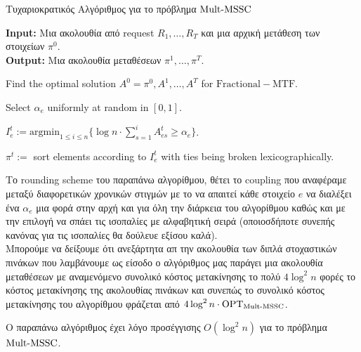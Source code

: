 \begin{algorithm}[ht]
  \caption{Τυχαριοκρατικός Αλγόριθμος για το πρόβλημα $\mathrm{Mult}\text{-}\mathrm{MSSC}$}\label{alg:rand_rounding}
  \textbf{Input:} Μια ακολουθία από request $R_1,\ldots,R_T$ και μια αρχική μετάθεση των στοιχείων $\pi^0$.\\
  \textbf{Output:} Μια ακολουθία μεταθέσεων $\pi^1,\ldots,\pi^T$.

 \begin{algorithmic}[1]
 \STATE Find the optimal solution $A^0=\pi^0,A^1,\ldots,A^T$ for $\mathrm{Fractional-MTF}$. 

        \STATE Select $\alpha_e$ uniformly at random in $[0,1]$.
        \ENDFOR

              
                \STATE $I_e^t := \mathrm{argmin}_{1\leq i \leq n} \{ \log n \cdot \sum_{s=1}^i 
                A_{es}^t \geq \alpha_e\}$.
        \ENDFOR
            
            \STATE $\pi^t:=$ sort elements according to $I_e^t$ with ties being broken lexicographically.
\ENDFOR
  \end{algorithmic}
\end{algorithm}

Το rounding scheme του παραπάνω αλγορίθμου, θέτει το coupling που αναφέραμε μεταξύ διαφορετικών χρονικών στιγμών με το να απαιτεί κάθε στοιχείο $e$ να διαλέξει ένα $\alpha_e$ μια φορά στην αρχή και για όλη την διάρκεια του αλγορίθμου καθώς και με την επιλογή να σπάει τις ισοπαλίες με αλφαβητική σειρά (οποιοσδήποτε συνεπής κανόνας για τις ισοπαλίες θα δούλευε εξίσου καλά).  \\

Μπορούμε να δείξουμε ότι ανεξάρτητα απ την ακολουθία των διπλά στοχαστικών πινάκων που λαμβάνουμε ως είσοδο ο αλγόριθμος μας παράγει μια ακολουθία μεταθέσεων με αναμενόμενο συνολικό κόστος μετακίνησης το πολύ $4\log^2 n$ φορές το κόστος μετακίνησης της ακολουθίας πινάκων και συνεπώς το συνολικό κόστος μετακίνησης του αλγορίθμου φράζεται από $4\log^2 n \cdot \mathrm{OPT}_{\mathrm{Mult}\text{-}\mathrm{MSSC}}$. 

\begin{θεώρημα}\label{t:rand}
Ο παραπάνω αλγόριθμος έχει λόγο προσέγγισης $O(\log^2 n)$ για το πρόβλημα $\mathrm{Mult}\text{-}\mathrm{MSSC}$.
\end{θεώρημα}

